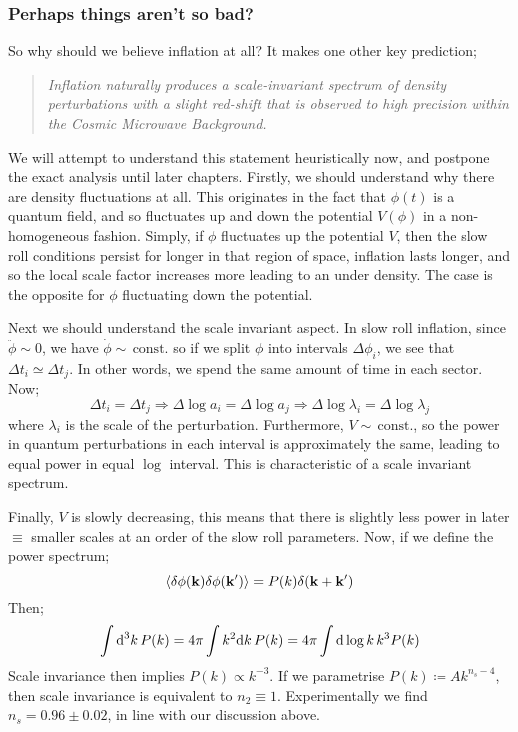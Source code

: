 \subsubsection{Perhaps things aren't so bad?}
So why should we believe inflation at all? It makes one other key prediction;
\begin{quote}
\emph{Inflation naturally produces a scale-invariant spectrum of density perturbations with a slight red-shift that is observed to high precision within the Cosmic Microwave Background.}
\end{quote}
We will attempt to understand this statement heuristically now, and postpone the exact analysis until later chapters. Firstly, we should understand why there are density fluctuations at all. This originates in the fact that $\phi(t)$ is a quantum field, and so fluctuates up and down the potential $V(\phi)$ in a non-homogeneous fashion. Simply, if $\phi$ fluctuates up the potential $V$, then the slow roll conditions persist for longer in that region of space, inflation lasts longer, and so the local scale factor increases more leading to an under density. The case is the opposite for $\phi$ fluctuating down the potential.

\paraskip
Next we should understand the scale invariant aspect. In slow roll inflation, since $\ddot{\phi} \sim 0$, we have $\dot{\phi} \sim \, \text{const.}$ so if we split $\phi$ into intervals $\Delta \phi_i$, we see that $\Delta t_i \simeq \Delta t_j$. In other words, we spend the same amount of time in each sector. Now;
\begin{equation*}
\Delta t_i = \Delta t_j \Rightarrow \Delta \log a_i = \Delta \log a_j \Rightarrow \Delta \log \lambda_i = \Delta \log \lambda_j
\end{equation*}
where $\lambda_i$ is the scale of the perturbation. Furthermore, $V \sim \,\text{const.}$, so the power in quantum perturbations in each interval is approximately the same, leading to equal power in equal $\log$ interval. This is characteristic of a scale invariant spectrum. 

\paraskip
Finally, $V$ is slowly decreasing, this means that there is slightly less power in later $\equiv$ smaller scales at an order of the slow roll parameters. Now, if we define the power spectrum; 
\begin{equation*}
\langle \delta \phi(\mathbf{k}) \delta \phi(\mathbf{k}^{\prime}) \rangle = P(k) \delta(\mathbf{k} + \mathbf{k}^{\prime})
\end{equation*}
Then;
\begin{equation*}
\int{\text{d}^3 k \,P(k)} = 4\pi \int{k^2 \text{d}k \,P(k)} = 4\pi \int{\text{d}\log k \,k^3 P(k)}
\end{equation*}
Scale invariance then implies $P(k) \propto k^{-3}$. If we parametrise $P(k) \coloneqq Ak^{n_s - 4}$, then scale invariance is equivalent to $n_2 \equiv 1$. Experimentally we find $n_s = 0.96 \pm 0.02$, in line with our discussion above.
\newpage
